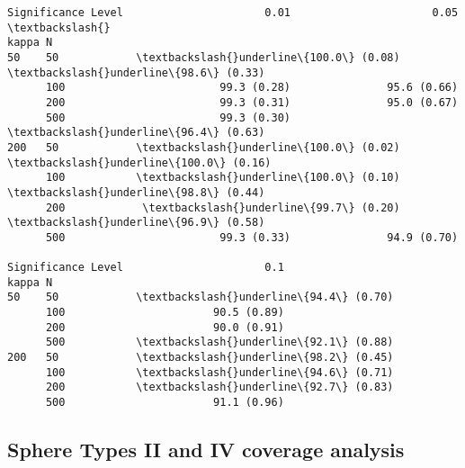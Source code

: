 \documentclass[11pt]{article}
\begin{document}
    
    \begin{Verbatim}[commandchars=\\\{\}]
Significance Level                      0.01                      0.05  \textbackslash{}
kappa N                                                                  
50    50            \textbackslash{}underline\{100.0\} (0.08)   \textbackslash{}underline\{98.6\} (0.33)   
      100                        99.3 (0.28)               95.6 (0.66)   
      200                        99.3 (0.31)               95.0 (0.67)   
      500                        99.3 (0.30)   \textbackslash{}underline\{96.4\} (0.63)   
200   50            \textbackslash{}underline\{100.0\} (0.02)  \textbackslash{}underline\{100.0\} (0.16)   
      100           \textbackslash{}underline\{100.0\} (0.10)   \textbackslash{}underline\{98.8\} (0.44)   
      200            \textbackslash{}underline\{99.7\} (0.20)   \textbackslash{}underline\{96.9\} (0.58)   
      500                        99.3 (0.33)               94.9 (0.70)   

Significance Level                      0.1  
kappa N                                      
50    50            \textbackslash{}underline\{94.4\} (0.70)  
      100                       90.5 (0.89)  
      200                       90.0 (0.91)  
      500           \textbackslash{}underline\{92.1\} (0.88)  
200   50            \textbackslash{}underline\{98.2\} (0.45)  
      100           \textbackslash{}underline\{94.6\} (0.71)  
      200           \textbackslash{}underline\{92.7\} (0.83)  
      500                       91.1 (0.96)  
    \end{Verbatim}

    
    \subsection{Sphere Types II and IV coverage
analysis}\label{sphere-types-ii-and-iv-coverage-analysis}
\end{document}
